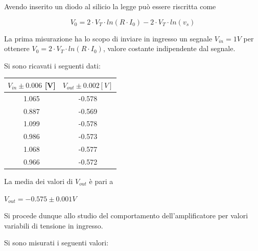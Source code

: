 \documentclass[journal]{IEEEtran}
\begin{document}
Avendo inserito un diodo al silicio la legge può essere riscritta come 

\begin{equation}
V_0 = 2 \cdot V_T \cdot ln(R \cdot I_0) - 2 \cdot V_T \cdot ln(v_s)
\end{equation}

La prima misurazione ha lo scopo di inviare in ingresso un segnale $V_{in} = 1V$ per ottenere  $V_0 = 2 \cdot V_T \cdot ln(R \cdot I_0)$, valore costante indipendente dal segnale.

Si sono ricavati i seguenti dati:

\begin{tabular}{|c|c|}
\hline
$V_{in} \pm 0.006 $ [V] & $V_{out} \pm 0.002 [V]$   \\ \hline
1.065 & -0.578 \\ \hline
0.887 & -0.569 \\ \hline
1.099 & -0.578 \\ \hline
0.986 & -0.573 \\ \hline
1.068 & -0.577 \\ \hline
0.966 & -0.572 \\ \hline
\end{tabular}

La media dei valori di $V_{out}$ è pari a 

$V_{out} = -0.575 \pm 0.001 V$

Si procede dunque allo studio del comportamento dell'amplificatore per valori variabili di tensione in ingresso.

Si sono misurati i seguenti valori:
\end{document}
